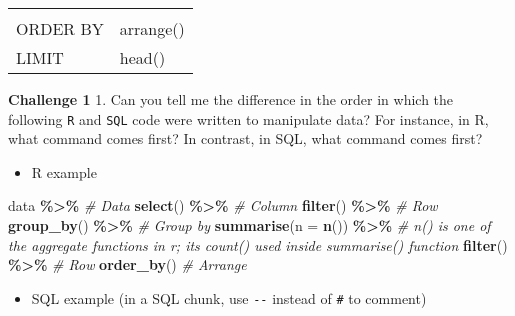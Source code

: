\documentclass[
]{book}
\newenvironment{Shaded}{\begin{snugshade}}{\end{snugshade}}
\newcommand{\CommentTok}[1]{\textcolor[rgb]{0.56,0.35,0.01}{\textit{#1}}}
\newcommand{\DataTypeTok}[1]{\textcolor[rgb]{0.13,0.29,0.53}{#1}}
\newcommand{\KeywordTok}[1]{\textcolor[rgb]{0.13,0.29,0.53}{\textbf{#1}}}
\newcommand{\NormalTok}[1]{#1}
\newcommand{\OperatorTok}[1]{\textcolor[rgb]{0.81,0.36,0.00}{\textbf{#1}}}
\newcommand{\StringTok}[1]{\textcolor[rgb]{0.31,0.60,0.02}{#1}}
\providecommand{\tightlist}{%
  \setlength{\itemsep}{0pt}\setlength{\parskip}{0pt}}
\begin{document}
\begin{longtable}[]{@{}ll@{}}
\begin{minipage}[t]{0.80\columnwidth}
\end{minipage}\tabularnewline
\begin{minipage}[t]{0.14\columnwidth}\raggedright
ORDER BY\strut
\end{minipage} & \begin{minipage}[t]{0.80\columnwidth}\raggedright
arrange()\strut
\end{minipage}\tabularnewline
\begin{minipage}[t]{0.14\columnwidth}\raggedright
LIMIT\strut
\end{minipage} & \begin{minipage}[t]{0.80\columnwidth}\raggedright
head()\strut
\end{minipage}\tabularnewline
\bottomrule
\end{longtable}

\textbf{Challenge 1}
1. Can you tell me the difference in the order in which the following \texttt{R} and \texttt{SQL} code were written to manipulate data? For instance, in R, what command comes first? In contrast, in SQL, what command comes first?

\begin{itemize}
\tightlist
\item
  R example
\end{itemize}

\begin{Shaded}
\begin{Highlighting}[]

\NormalTok{data }\OperatorTok{\%\textgreater{}\%}\StringTok{ }\CommentTok{\# Data }
\StringTok{  }\KeywordTok{select}\NormalTok{() }\OperatorTok{\%\textgreater{}\%}\StringTok{ }\CommentTok{\# Column}
\StringTok{  }\KeywordTok{filter}\NormalTok{() }\OperatorTok{\%\textgreater{}\%}\StringTok{ }\CommentTok{\# Row }
\StringTok{  }\KeywordTok{group\_by}\NormalTok{() }\OperatorTok{\%\textgreater{}\%}\StringTok{ }\CommentTok{\# Group by }
\StringTok{  }\KeywordTok{summarise}\NormalTok{(}\DataTypeTok{n =} \KeywordTok{n}\NormalTok{()) }\OperatorTok{\%\textgreater{}\%}\StringTok{ }\CommentTok{\# n() is one of the aggregate functions in r; it\textquotesingle{}s count() used inside summarise() function }
\StringTok{  }\KeywordTok{filter}\NormalTok{() }\OperatorTok{\%\textgreater{}\%}\StringTok{ }\CommentTok{\# Row }
\StringTok{  }\KeywordTok{order\_by}\NormalTok{() }\CommentTok{\# Arrange }
\end{Highlighting}
\end{Shaded}

\begin{itemize}
\tightlist
\item
  SQL example (in a SQL chunk, use \texttt{-\/-} instead of \texttt{\#} to comment)
\end{itemize}
\end{document}
